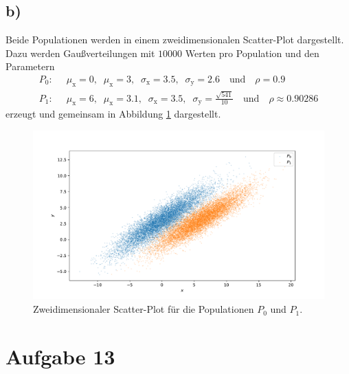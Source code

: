\documentclass[a4paper, 11pt]{article}
\begin{document}
\subsection*{b)}
Beide Populationen werden in einem zweidimensionalen Scatter-Plot dargestellt.
Dazu werden Gaußverteilungen mit $10000$ Werten pro Population und den Parametern
\begin{align*}
  P_0:\;\; &\mu_\text{x} = 0,\;\; \mu_\text{x} = 3,\;\; \sigma_\text{x}=3.5,\;\;
   \sigma_\text{y}=2.6 \quad \text{und} \quad \rho=0.9 \\
  P_1:\;\; &\mu_\text{x} = 6,\;\; \mu_\text{x} = 3.1,\;\; \sigma_\text{x}=3.5,\;\;
  \sigma_\text{y}= \frac{\sqrt{541}}{10} \quad \text{und} \quad \rho\approx 0.90286
\end{align*}
erzeugt und gemeinsam in Abbildung \ref{fig:populationen} dargestellt.
\begin{figure}[H]
  \centering
  \includegraphics[width=\textwidth]{../A12/A12b.pdf}
  \caption{Zweidimensionaler Scatter-Plot für die Populationen $P_0$ und $P_1$.}
  \label{fig:populationen}
\end{figure}



\FloatBarrier

\section*{Aufgabe 13}
\end{document}
